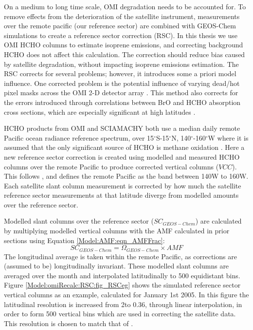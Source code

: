     On a medium to long time scale, OMI degradation needs to be accounted for.
    To remove effects from the deterioration of the satellite instrument, measurements over the remote pacific (our reference sector) are combined with GEOS-Chem simulations to create a reference sector correction (RSC).
    In this thesis we use OMI HCHO columns to estimate isoprene emissions, and correcting background HCHO does not affect this calculation.
    The correction should reduce bias caused by satellite degradation, without impacting isoprene emissions estimation.
    The RSC corrects for several problems; however, it introduces some a priori model influence.
    One corrected problem is the potential influence of varying dead/hot pixel masks across the OMI 2-D detector array \parencite{DeSmedt2015}.
    This method also corrects for the errors introduced through correlations between BrO and HCHO absorption cross sections, which are especially significant at high latitudes \parencite{Abad2015}.
    
    HCHO products from OMI and SCIAMACHY both use a median daily remote Pacific ocean radiance reference spectrum, over 15$^{\circ}$S-15$^{\circ}$N, 140$^{\circ}$-160$^{\circ}$W where it is assumed that the only significant source of HCHO is methane oxidation \parencite{DeSmedt2008,Barkley2013,Kurosu2014}.
    Here a new reference sector correction is created using modelled and measured HCHO columns over the remote Pacific to produce corrected vertical columns ($VCC$).
    This follows \textcite{Abad2016}, and defines the remote Pacific as the band between 140{\degr}W to 160{\degr}W.
    Each satellite slant column measurement is corrected by how much the satellite reference sector measurements at that latitude diverge from modelled amounts over the reference sector.
    
    
    Modelled slant columns over the reference sector ($SC_{GEOS-Chem}$) are calculated by multiplying modelled vertical columns with the AMF calculated in prior sections using Equation \ref{Model:AMF:eqn_AMFFrac}: 
    \begin{equation*}
      SC_{GEOS-Chem} = \Omega_{GEOS-Chem} \times AMF
    \end{equation*}
    The longitudinal average is taken within the remote Pacific, as corrections are (assumed to be) longitudinally invariant.
    These modelled slant columns are averaged over the month and interpolated latitudinally to 500 equidistant bins.
    Figure \ref{Model:omiRecalc:RSC:fig_RSCeg} shows the simulated reference sector vertical columns as an example, calculated for January 1st 2005.
    In this figure the latitudinal resolution is increased from 2\degr to 0.36\degr, through linear interpolation, in order to form 500 vertical bins which are used in correcting the satellite data.
    This resolution is chosen to match that of \textcite{Abad2016}.
    
